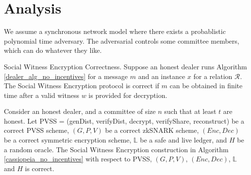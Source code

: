 \section{Analysis}
We assume a synchronous network model where there exists a probablistic polynomial time adversary.
The adversarial controls some committee members, which can do whatever they like.
\begin{definition}{Social Witness Encryption Correctness.}
    Suppose an honest dealer runs Algorithm \ref{dealer_alg_no_incentives} for a message $m$ and an instance $x$ for a relation $\mathcal{R}$.
    The Social Witness Encryption protocol is correct if $m$ can be obtained in finite time after a valid witness $w$ is provided for decryption.
\end{definition}
\begin{theorem}
    Consider an honest dealer, and a committee of size $n$ such that at least $t$ are honest.
    Let \textsf{PVSS} = (\textsf{genDist}, \textsf{verifyDist}, \textsf{decrypt}, \textsf{verifyShare}, \textsf{reconstruct}) be a correct PVSS scheme,
    $(G, P, V)$ be a correct zkSNARK scheme, $(Enc, Dec)$ be a correct symmetric encryption scheme,
    $\mathbb{L}$ be a safe and live ledger, and $H$ be a random oracle.
    The Social Witness Encryption construction in Algorithm \ref{cassiopeia_no_incentives} with respect to \textsf{PVSS}, $(G, P, V)$, $(Enc, Dec)$, $\mathbb{L}$ and $H$ is correct.
\end{theorem}

